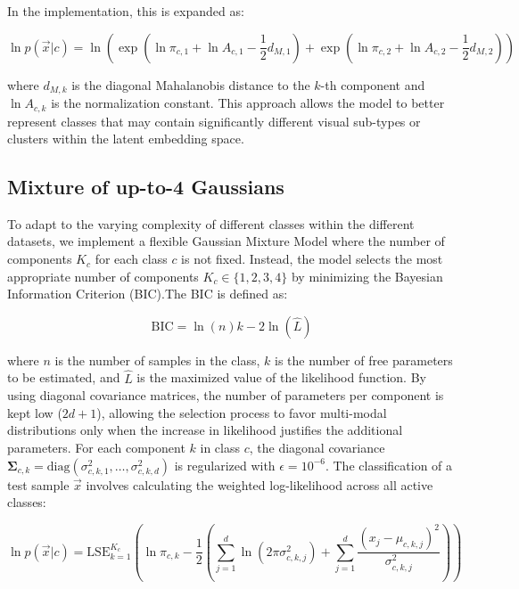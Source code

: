 In the implementation, this is expanded as:

\begin{equation}
	\ln p(\vec{x}|c) = \ln \left( \exp( \ln \pi_{c,1} + \ln A_{c,1} - \frac{1}{2} d_{M,1} ) + \exp( \ln \pi_{c,2} + \ln A_{c,2} - \frac{1}{2} d_{M,2} ) \right)
\end{equation}

where $d_{M,k}$ is the diagonal Mahalanobis distance to the $k$-th component and $\ln A_{c,k}$ is the normalization constant. This approach allows the model to better represent classes that may contain significantly different visual sub-types or clusters within the latent embedding space.


\subsection{Mixture of up-to-4 Gaussians}

To adapt to the varying complexity of different classes within the different datasets, we implement a flexible Gaussian Mixture Model where the number of components $K_c$ for each class $c$ is not fixed. Instead, the model selects the most appropriate number of components $K_c \in \{1, 2, 3, 4\}$ by minimizing the Bayesian Information Criterion (BIC).The BIC is defined as:

\begin{equation}
	\text{BIC} = \ln(n)k - 2\ln(\hat{L})
	\label{eq:bic_mog4}
\end{equation}

where $n$ is the number of samples in the class, $k$ is the number of free parameters to be estimated, and $\hat{L}$ is the maximized value of the likelihood function. By using diagonal covariance matrices, the number of parameters per component is kept low ($2d + 1$), allowing the selection process to favor multi-modal distributions only when the increase in likelihood justifies the additional parameters. For each component $k$ in class $c$, the diagonal covariance $\boldsymbol{\Sigma}_{c,k} = \text{diag}(\sigma_{c,k,1}^2, \dots, \sigma_{c,k,d}^2)$ is regularized with $\epsilon = 10^{-6}$. The classification of a test sample $\vec{x}$ involves calculating the weighted log-likelihood across all active classes:

\begin{equation}
	\ln p(\vec{x}|c) = \text{LSE}_{k=1}^{K_c} \left( \ln \pi_{c,k} - \frac{1}{2} \left( \sum_{j=1}^{d} \ln(2\pi\sigma_{c,k,j}^2) + \sum_{j=1}^{d} \frac{(x_j - \mu_{c,k,j})^2}{\sigma_{c,k,j}^2} \right) \right)
\end{equation}

